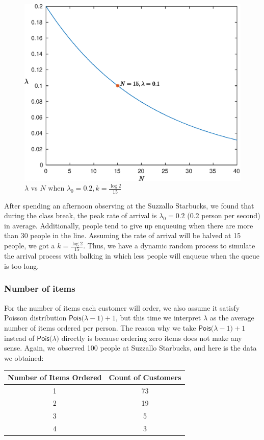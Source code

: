 \documentclass[a4paper]{article}
\newcommand{\pois}[1]{\mathsf{Pois(}{#1}\mathsf{)}}
\begin{document}
\begin{figure}[H]
	\centering
	\includegraphics[width=0.35\textheight]{arrival_lambda}
	\caption{$\lambda$ vs $N$ when $\lambda_0=0.2,k=\frac{\log 2}{15}$}
\end{figure}

After spending an afternoon observing at the Suzzallo Starbucks, we found that during the class break, the peak rate of arrival is $\lambda_0=0.2$ (0.2 person per second) in average. Additionally, people tend to give up enqueuing when there are more than 30 people in the line. Assuming the rate of arrival will be halved at 15 people, we got a $k=\frac{\log 2}{15}$. Thus, we have a dynamic random process to simulate the arrival process with balking in which less people will enqueue when the queue is too long.

\subsubsection{Number of items}

For the number of items each customer will order, we also assume it satisfy Poisson distribution \mbox{$\pois{\lambda-1}+1$}, but this time we interpret $\lambda$ as the average number of items ordered per person. The reason why we take \mbox{$\pois{\lambda-1}+1$} instead of $\pois{\lambda}$ directly is because ordering zero items does not make any sense. Again, we observed 100 people at Suzzallo Starbucks, and here is the data we obtained:

\begin{center}
    \begin{tabular}{ c | c }
    	Number of Items Ordered & Count of Customers \\
    	\hline
        1 & 73 \\
        2 & 19 \\
        3 & 5 \\
        4 & 3
    \end{tabular}
\end{center}
\end{document}
